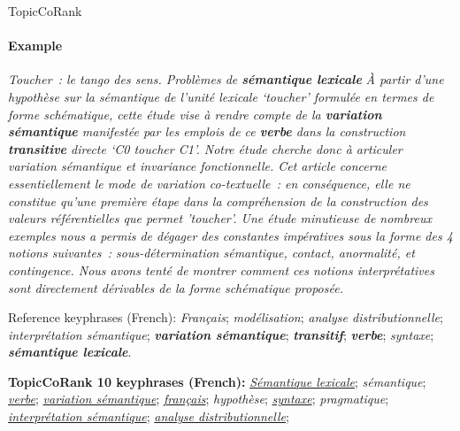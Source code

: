 \begin{frame}{TopicCoRank}\framesubtitle{Example}
  \vfill{}
  \begin{exampleblock}{\normalsize
    \textit{Toucher~: le tango des sens. Problèmes de \textbf{sémantique lexicale}}
  }\justifying\footnotesize
    \textit{À partir d'une hypothèse sur la sémantique de l'unité lexicale `toucher' formulée en termes de forme schématique, cette étude vise à rendre compte de la \textbf{variation sémantique} manifestée par les emplois de ce \textbf{verbe} dans la construction \textbf{transitive} directe `C0 toucher C1'. Notre étude cherche donc à articuler variation sémantique et invariance fonctionnelle. Cet article concerne essentiellement le mode de variation co-textuelle~: en conséquence, elle ne constitue qu'une première étape dans la compréhension de la construction des valeurs référentielles que permet 'toucher'. Une étude minutieuse de nombreux exemples nous a permis de dégager des constantes impératives sous la forme des 4 notions suivantes~: sous-détermination sémantique, contact, anormalité, et contingence. Nous avons tenté de montrer comment ces notions interprétatives sont directement dérivables de la forme schématique proposée.}
  
    \begin{exampleblock}{\normalsize Reference keyphrases (French):}
      \textit{Français}; \textit{modélisation}; \textit{analyse distributionnelle}; \textit{interprétation sémantique}; \textbf{\textit{variation sémantique}}; \textbf{\textit{transitif}}; \textbf{\textit{verbe}}; \textit{syntaxe}; \textbf{\textit{sémantique lexicale}}.
    \end{exampleblock}
    
    \vspace{-.75em}
    
    \begin{exampleblock}{\normalsize \textbf{TopicCoRank 10 keyphrases (French):}}
      \underline{\textit{Sémantique lexicale}};
      \textit{sémantique};
      \underline{\textit{verbe}};
      \underline{\textit{variation sémantique}};
      \underline{\textit{français}};
      \textit{hypothèse};
      \underline{\textit{syntaxe}};
      \textit{pragmatique};
      \underline{\textit{interprétation sémantique}};
      \underline{\textit{analyse distributionnelle}};
    \end{exampleblock}
  \end{exampleblock}
  \vfill{}
\end{frame}


